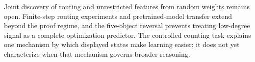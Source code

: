 Joint discovery of routing and unrestricted features from random weights remains open.
Finite-step routing experiments and pretrained-model transfer extend beyond the proof regime,
and the five-object reversal prevents treating low-degree signal as a complete optimization
predictor. The controlled counting task explains one mechanism by which displayed states
make learning easier; it does not yet characterize when that mechanism governs broader reasoning.
